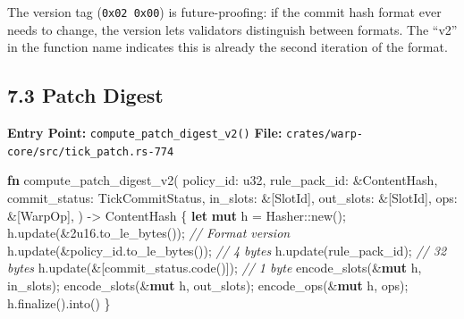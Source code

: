 \documentclass[11pt]{book}
\newenvironment{Shaded}{}{}
\newcommand{\BuiltInTok}[1]{\textcolor[rgb]{0.00,0.50,0.00}{#1}}
\newcommand{\CommentTok}[1]{\textcolor[rgb]{0.38,0.63,0.69}{\textit{#1}}}
\newcommand{\DataTypeTok}[1]{\textcolor[rgb]{0.56,0.13,0.00}{#1}}
\newcommand{\DecValTok}[1]{\textcolor[rgb]{0.25,0.63,0.44}{#1}}
\newcommand{\KeywordTok}[1]{\textcolor[rgb]{0.00,0.44,0.13}{\textbf{#1}}}
\newcommand{\NormalTok}[1]{#1}
\newcommand{\OperatorTok}[1]{\textcolor[rgb]{0.40,0.40,0.40}{#1}}
\newcommand{\PreprocessorTok}[1]{\textcolor[rgb]{0.74,0.48,0.00}{#1}}
\begin{document}
\begin{tourguide}
The version tag (\texttt{0x02 0x00}) is future-proofing: if the commit hash format ever needs to change, the version lets validators distinguish between formats. The ``v2'' in the function name indicates this is already the second iteration of the format.
\end{tourguide}

\subsection{7.3 Patch Digest}\label{patch-digest}

\textbf{Entry Point:} \texttt{compute\_patch\_digest\_v2()}
\textbf{File:} \texttt{crates/warp-core/src/tick\_patch.rs-774}

\begin{Shaded}
\begin{Highlighting}[]
\KeywordTok{fn}\NormalTok{ compute\_patch\_digest\_v2(}
\NormalTok{    policy\_id}\OperatorTok{:} \DataTypeTok{u32}\OperatorTok{,}
\NormalTok{    rule\_pack\_id}\OperatorTok{:} \OperatorTok{\&}\NormalTok{ContentHash}\OperatorTok{,}
\NormalTok{    commit\_status}\OperatorTok{:}\NormalTok{ TickCommitStatus}\OperatorTok{,}
\NormalTok{    in\_slots}\OperatorTok{:} \OperatorTok{\&}\NormalTok{[SlotId]}\OperatorTok{,}
\NormalTok{    out\_slots}\OperatorTok{:} \OperatorTok{\&}\NormalTok{[SlotId]}\OperatorTok{,}
\NormalTok{    ops}\OperatorTok{:} \OperatorTok{\&}\NormalTok{[WarpOp]}\OperatorTok{,}
\NormalTok{) }\OperatorTok{{-}\textgreater{}}\NormalTok{ ContentHash }\OperatorTok{\{}
    \KeywordTok{let} \KeywordTok{mut}\NormalTok{ h }\OperatorTok{=} \BuiltInTok{Hasher}\PreprocessorTok{::}\NormalTok{new()}\OperatorTok{;}
\NormalTok{    h}\OperatorTok{.}\NormalTok{update(}\OperatorTok{\&}\DecValTok{2u16}\OperatorTok{.}\NormalTok{to\_le\_bytes())}\OperatorTok{;}         \CommentTok{// Format version}
\NormalTok{    h}\OperatorTok{.}\NormalTok{update(}\OperatorTok{\&}\NormalTok{policy\_id}\OperatorTok{.}\NormalTok{to\_le\_bytes())}\OperatorTok{;}    \CommentTok{// 4 bytes}
\NormalTok{    h}\OperatorTok{.}\NormalTok{update(rule\_pack\_id)}\OperatorTok{;}                \CommentTok{// 32 bytes}
\NormalTok{    h}\OperatorTok{.}\NormalTok{update(}\OperatorTok{\&}\NormalTok{[commit\_status}\OperatorTok{.}\NormalTok{code()])}\OperatorTok{;}     \CommentTok{// 1 byte}
\NormalTok{    encode\_slots(}\OperatorTok{\&}\KeywordTok{mut}\NormalTok{ h}\OperatorTok{,}\NormalTok{ in\_slots)}\OperatorTok{;}
\NormalTok{    encode\_slots(}\OperatorTok{\&}\KeywordTok{mut}\NormalTok{ h}\OperatorTok{,}\NormalTok{ out\_slots)}\OperatorTok{;}
\NormalTok{    encode\_ops(}\OperatorTok{\&}\KeywordTok{mut}\NormalTok{ h}\OperatorTok{,}\NormalTok{ ops)}\OperatorTok{;}
\NormalTok{    h}\OperatorTok{.}\NormalTok{finalize()}\OperatorTok{.}\NormalTok{into()}
\OperatorTok{\}}
\end{Highlighting}
\end{Shaded}
\end{document}
